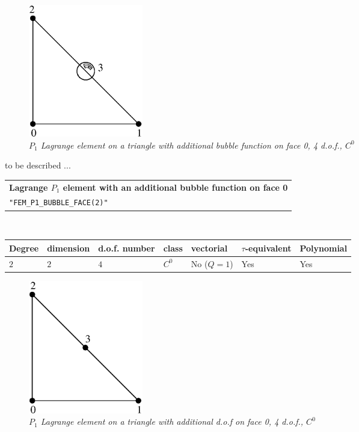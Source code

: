 \documentclass[11pt,a4paper]{article}
\begin{document}
\begin{figure}[H]
  \begin{center}
    \includegraphics[width=5cm,angle=0]{getfemlist_triangle_P1_bubble_face.eps}
  \end{center}
  \caption{ \it $P_1$ Lagrange element on a triangle with additional bubble function on face 0, 4 d.o.f., $C^0$} 
  \label{fig:triangle_p1_bubble_face}
\end{figure}

to be described ...

\begin{center}
\begin{tabular}{|m{16.11cm}|} \hline 
{ \bf Lagrange $P_1$ element with an additional bubble function on face 0}\\
{\tt "FEM\_P1\_BUBBLE\_FACE(2)"} 
\end{tabular} \\ \vspace{-1pt} 
\begin{tabular}{|m{2cm}|m{2cm}|m{2.5cm}|m{1.2cm}|m{2cm}|m{2cm}|m{1.8cm}|} \hline 
Degree & dimension & d.o.f. number & class & vectorial & \mbox{$\tau$-equivalent} & Polynomial\\ \hline
$2$ & $2$ & $4$ & $C^0$ & No \mbox{($Q = 1$)} & Yes & Yes\\ \hline
\end{tabular}
\end{center}

\begin{figure}[H]
  \begin{center}
    \includegraphics[width=5cm,angle=0]{getfemlist_triangle_P1_with_P2_face.eps}
  \end{center}
  \caption{ \it $P_1$ Lagrange element on a triangle with additional d.o.f on face 0, 4 d.o.f., $C^0$} 
  \label{fig:triangle_p1_p2_face}
\end{figure}
\end{document}
